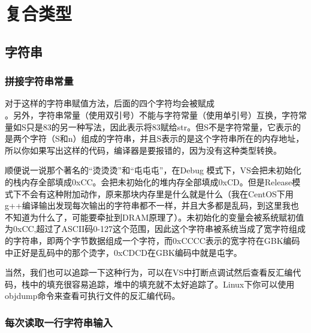 
\chapter{复合类型}

\addtocounter{section}{1}

\section{字符串}

\subsection{拼接字符串常量}

对于这样的字符串赋值方法，后面的四个字符均会被赋成\\ \leftqm{}\rightqm\thinspace。另外，字符串常量（使用双引号）不能与字符常量（使用单引号）互换，字符常量如\thinspace{}S\thinspace 只是83的另一种写法，因此表示将83赋给str。但\thinspace{}S\thinspace 不是字符常量，它表示的是两个字符（S和\thinspace\mybackslash n\thinspace）组成的字符串，并且\thinspace{}S\thinspace 表示的是这个字符串所在的内存地址，所以你如果写出这样的代码，编译器是要报错的，因为没有这种类型转换。\dpar

顺便说一说那个著名的“烫烫烫”和“屯屯屯”，在Debug 模式下，VS会把未初始化的栈内存全部填成0xCC。会把未初始化的堆内存全部填成0xCD。但是Release模式下不会有这种附加动作，原来那块内存里是什么就是什么（我在CentOS下用g++编译输出发现每次输出的字符串都不一样，并且大多都是乱码，到这里我也不知道为什么了，可能要牵扯到DRAM原理了）。未初始化的变量会被系统赋初值为0xCC,超过了ASCII码0-127这个范围，因此这个字符串被系统当成了宽字符组成的字符串，即两个字节数据组成一个字符，而0xCCCC表示的宽字符在GBK编码中正好是乱码中的那个烫字，0xCDCD在GBK编码中就是屯字。

当然，我们也可以追踪一下这种行为，可以在VS中打断点调试然后查看反汇编代码，栈中的填充很容易追踪，堆中的填充就不太好追踪了。Linux下你可以使用objdump命令来查看可执行文件的反汇编代码。

\addtocounter{subsection}{2}

\subsection{每次读取一行字符串输入}

